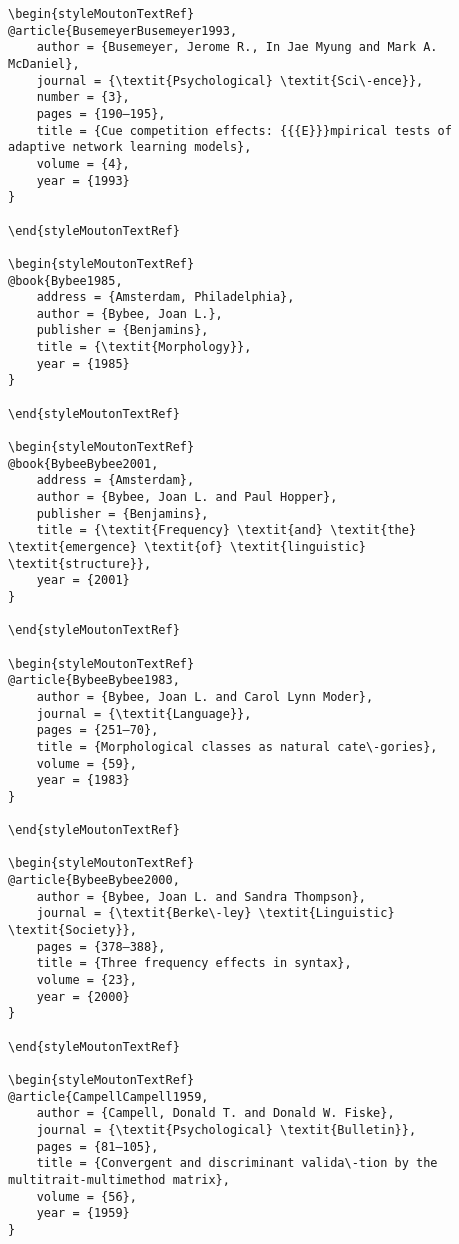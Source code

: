 \begin{styleMoutonHeadingi}
\begin{verbatim}
\begin{styleMoutonTextRef}
@article{BusemeyerBusemeyer1993,
	author = {Busemeyer, Jerome R., In Jae Myung and Mark A. McDaniel},
	journal = {\textit{Psychological} \textit{Sci\-ence}},
	number = {3},
	pages = {190–195},
	title = {Cue competition effects: {{{E}}}mpirical tests of adaptive network learning models},
	volume = {4},
	year = {1993}
}

\end{styleMoutonTextRef}

\begin{styleMoutonTextRef}
@book{Bybee1985,
	address = {Amsterdam, Philadelphia},
	author = {Bybee, Joan L.},
	publisher = {Benjamins},
	title = {\textit{Morphology}},
	year = {1985}
}

\end{styleMoutonTextRef}

\begin{styleMoutonTextRef}
@book{BybeeBybee2001,
	address = {Amsterdam},
	author = {Bybee, Joan L. and Paul Hopper},
	publisher = {Benjamins},
	title = {\textit{Frequency} \textit{and} \textit{the} \textit{emergence} \textit{of} \textit{linguistic} \textit{structure}},
	year = {2001}
}

\end{styleMoutonTextRef}

\begin{styleMoutonTextRef}
@article{BybeeBybee1983,
	author = {Bybee, Joan L. and Carol Lynn Moder},
	journal = {\textit{Language}},
	pages = {251–70},
	title = {Morphological classes as natural cate\-gories},
	volume = {59},
	year = {1983}
}

\end{styleMoutonTextRef}

\begin{styleMoutonTextRef}
@article{BybeeBybee2000,
	author = {Bybee, Joan L. and Sandra Thompson},
	journal = {\textit{Berke\-ley} \textit{Linguistic} \textit{Society}},
	pages = {378–388},
	title = {Three frequency effects in syntax},
	volume = {23},
	year = {2000}
}

\end{styleMoutonTextRef}

\begin{styleMoutonTextRef}
@article{CampellCampell1959,
	author = {Campell, Donald T. and Donald W. Fiske},
	journal = {\textit{Psychological} \textit{Bulletin}},
	pages = {81–105},
	title = {Convergent and discriminant valida\-tion by the multitrait-multimethod matrix},
	volume = {56},
	year = {1959}
}


\end{verbatim}
\end{styleMoutonHeadingi}
